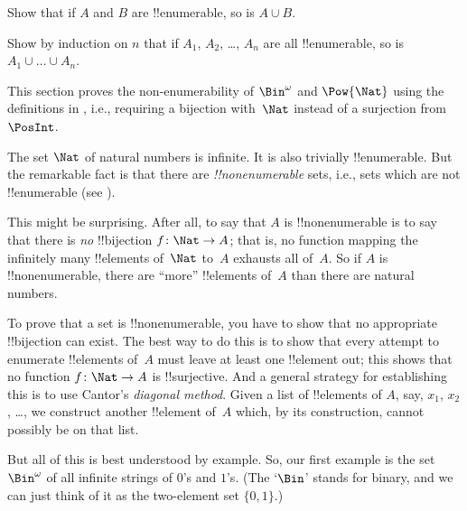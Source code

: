 \begin{prob}
Show that if $A$ and $B$ are !!{enumerable}, so is $A \cup B$.
\end{prob}

\begin{prob}
Show by induction on $n$ that if $A_1$, $A_2$, \dots, $A_n$ are all
!!{enumerable}, so is $A_1 \cup \dots \cup A_n$.
\end{prob}






\begin{editorial}
  This section proves the non-enumerability of $\Bin^\omega$ and
  $\Pow{\Nat}$ using the definitions in , i.e.,
  requiring a bijection with~$\Nat$ instead of a surjection from
  $\PosInt$.
\end{editorial}

\begin{explain}
The set $\Nat$ of natural numbers is infinite. It is also trivially
!!{enumerable}. But the remarkable fact is that there are
\emph{!!{nonenumerable}} sets, i.e., sets which are not !!{enumerable}
(see ).

This might be surprising. After all, to say that $A$ is
!!{nonenumerable} is to say that there is \emph{no} !!{bijection} $f
\colon \Nat \to A$; that is, no function mapping the infinitely many
!!{element}s of~$\Nat$ to~$A$ exhausts all of~$A$.  So if $A$ is
!!{nonenumerable}, there are ``more'' !!{element}s of~$A$ than there
are natural numbers.

To prove that a set is !!{nonenumerable}, you have to show that no
appropriate !!{bijection} can exist. The best way to do this is to
show that every attempt to enumerate !!{element}s of~$A$ must leave at
least one !!{element} out; this shows that no function $f\colon \Nat
\to A$ is !!{surjective}. And a general strategy for establishing this
is to use Cantor's \emph{diagonal method}. Given a list of
!!{element}s of $A$, say, $x_1$, $x_2$, \dots, we construct another
!!{element} of~$A$ which, by its construction, cannot possibly be on
that list.

But all of this is best understood by example. So, our first example
is the set~$\Bin^\omega$ of all infinite strings of $0$'s and $1$'s.
(The `$\Bin$' stands for binary, and we can just think of it as the
two-element set
$\{0,1\}$.)\end{explain}

